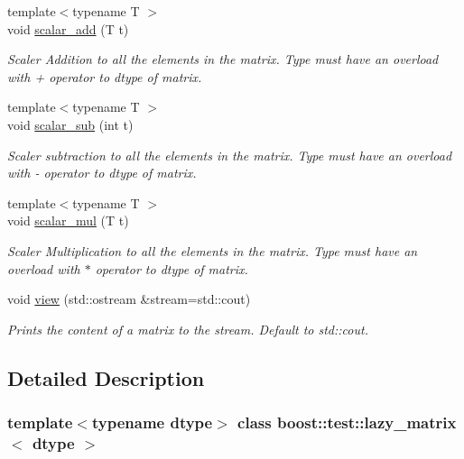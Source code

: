 \begin{DoxyCompactItemize}
{\footnotesize template$<$typename T $>$ }\\void \mbox{\hyperlink{classboost_1_1test_1_1lazy__matrix_a357bdf244789558e59663c09bea0c0b5}{scalar\+\_\+add}} (T t)
\begin{DoxyCompactList}\small\item\em Scaler Addition to all the elements in the matrix. Type must have an overload with + operator to dtype of matrix. \end{DoxyCompactList}\item 
{\footnotesize template$<$typename T $>$ }\\void \mbox{\hyperlink{classboost_1_1test_1_1lazy__matrix_ae47fb3f2e5ed004216f6d1f8b7fddf8d}{scalar\+\_\+sub}} (int t)
\begin{DoxyCompactList}\small\item\em Scaler subtraction to all the elements in the matrix. Type must have an overload with -\/ operator to dtype of matrix. \end{DoxyCompactList}\item 
{\footnotesize template$<$typename T $>$ }\\void \mbox{\hyperlink{classboost_1_1test_1_1lazy__matrix_a2ae5fb3fb4df67fe12f20f63b041e672}{scalar\+\_\+mul}} (T t)
\begin{DoxyCompactList}\small\item\em Scaler Multiplication to all the elements in the matrix. Type must have an overload with $\ast$ operator to dtype of matrix. \end{DoxyCompactList}\item 
void \mbox{\hyperlink{classboost_1_1test_1_1lazy__matrix_ac5f017b3fea88f8bea5bd20f9030b753}{view}} (std\+::ostream \&stream=std\+::cout)
\begin{DoxyCompactList}\small\item\em Prints the content of a matrix to the stream. Default to std\+::cout. \end{DoxyCompactList}\end{DoxyCompactItemize}


\subsection{Detailed Description}
\subsubsection*{template$<$typename dtype$>$\newline
class boost\+::test\+::lazy\+\_\+matrix$<$ dtype $>$}

